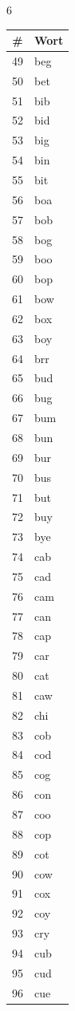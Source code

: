 \documentclass[11pt,a4paper]{article}
\begin{document}
\begin{multicols}{6}
\columnbreak

\begin{tabular}{cl}
\toprule
\# & Wort \\
\midrule
49 & beg \\
50 & bet \\
51 & bib \\
52 & bid \\
53 & big \\
54 & bin \\
55 & bit \\
56 & boa \\
57 & bob \\
58 & bog \\
59 & boo \\
60 & bop \\
61 & bow \\
62 & box \\
63 & boy \\
64 & brr \\
65 & bud \\
66 & bug \\
67 & bum \\
68 & bun \\
69 & bur \\
70 & bus \\
71 & but \\
72 & buy \\
73 & bye \\
74 & cab \\
75 & cad \\
76 & cam \\
77 & can \\
78 & cap \\
79 & car \\
80 & cat \\
81 & caw \\
82 & chi \\
83 & cob \\
84 & cod \\
85 & cog \\
86 & con \\
87 & coo \\
88 & cop \\
89 & cot \\
90 & cow \\
91 & cox \\
92 & coy \\
93 & cry \\
94 & cub \\
95 & cud \\
96 & cue \\
\bottomrule
\end{tabular}


\end{multicols}
\end{document}
